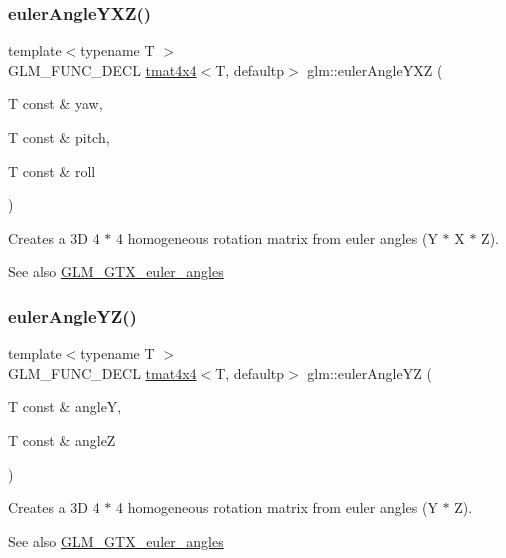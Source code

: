 \subsubsection{\texorpdfstring{euler\+Angle\+Y\+X\+Z()}{eulerAngleYXZ()}}
{\footnotesize\ttfamily template$<$typename T $>$ \\
G\+L\+M\+\_\+\+F\+U\+N\+C\+\_\+\+D\+E\+CL \hyperlink{structglm_1_1tmat4x4}{tmat4x4}$<$T, defaultp$>$ glm\+::euler\+Angle\+Y\+XZ (\begin{DoxyParamCaption}\item[{T const \&}]{yaw,  }\item[{T const \&}]{pitch,  }\item[{T const \&}]{roll }\end{DoxyParamCaption})}

Creates a 3D 4 $\ast$ 4 homogeneous rotation matrix from euler angles (Y $\ast$ X $\ast$ Z). \begin{DoxySeeAlso}{See also}
\hyperlink{group__gtx__euler__angles}{G\+L\+M\+\_\+\+G\+T\+X\+\_\+euler\+\_\+angles} 
\end{DoxySeeAlso}
\mbox{\label{group__gtx__euler__angles_ga1033f84f51d61646145352ef0c1bb58c}} 
\subsubsection{\texorpdfstring{euler\+Angle\+Y\+Z()}{eulerAngleYZ()}}
{\footnotesize\ttfamily template$<$typename T $>$ \\
G\+L\+M\+\_\+\+F\+U\+N\+C\+\_\+\+D\+E\+CL \hyperlink{structglm_1_1tmat4x4}{tmat4x4}$<$T, defaultp$>$ glm\+::euler\+Angle\+YZ (\begin{DoxyParamCaption}\item[{T const \&}]{angleY,  }\item[{T const \&}]{angleZ }\end{DoxyParamCaption})}

Creates a 3D 4 $\ast$ 4 homogeneous rotation matrix from euler angles (Y $\ast$ Z). \begin{DoxySeeAlso}{See also}
\hyperlink{group__gtx__euler__angles}{G\+L\+M\+\_\+\+G\+T\+X\+\_\+euler\+\_\+angles} 
\end{DoxySeeAlso}
\mbox{\label{group__gtx__euler__angles_gab59c4fe7f735568255cc19fddd3ddfcd}} 
